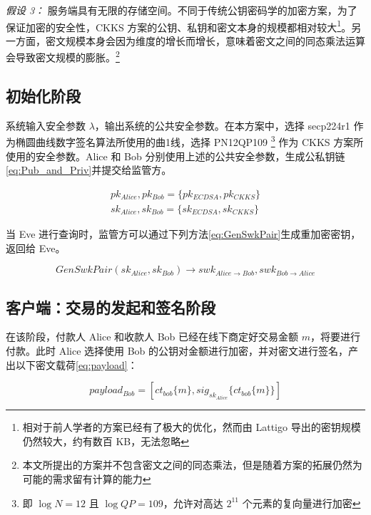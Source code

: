 \textit{假设 3：} 服务端具有无限的存储空间。不同于传统公钥密码学的加密方案，为了保证加密的安全性，CKKS 方案的公钥、私钥和密文本身的规模都相对较大\footnote{相对于前人学者的方案已经有了极大的优化，然而由 Lattigo 导出的密钥规模仍然较大，约有数百 KB，无法忽略}。另一方面，密文规模本身会因为维度的增长而增长，意味着密文之间的同态乘法运算会导致密文规模的膨胀。\footnote{本文所提出的方案并不包含密文之间的同态乘法，但是随着方案的拓展仍然为可能的需求留有计算的能力}

\subsection{初始化阶段}

系统输入安全参数 $\lambda$，输出系统的公共安全参数。在本方案中，选择 secp224r1 作为椭圆曲线数字签名算法所使用的曲1线，选择 PN12QP109 \footnote{即 $\log N = 12$ 且 $\log QP = 109$，允许对高达 $2^{11}$ 个元素的复向量进行加密} 作为 CKKS 方案所使用的安全参数。Alice 和 Bob 分别使用上述的公共安全参数，生成公私钥链\eqref{eq:Pub_and_Priv}并提交给监管方。

\begin{equation} \label{eq:Pub_and_Priv}
\begin{aligned}
    pk_{Alice}, pk_{Bob} = \{pk_{ECDSA}, pk_{CKKS}\}\\
    sk_{Alice}, sk_{Bob} = \{sk_{ECDSA}, sk_{CKKS}\}
\end{aligned}
\end{equation}

当 Eve 进行查询时，监管方可以通过下列方法\eqref{eq:GenSwkPair}生成重加密密钥，返回给 Eve。

\begin{equation} \label{eq:GenSwkPair}
    GenSwkPair(sk_{Alice}, sk_{Bob}) \rightarrow swk_{Alice \rightarrow Bob},
    swk_{Bob \rightarrow Alice}
\end{equation}

\subsection{客户端：交易的发起和签名阶段}

在该阶段，付款人 Alice 和收款人 Bob 已经在线下商定好交易金额 $m$，将要进行付款。此时 Alice 选择使用 Bob 的公钥对金额进行加密，并对密文进行签名，产出以下密文载荷\eqref{eq:payload}：

\begin{equation} \label{eq:payload}
payload_{Bob} = [ct_{bob}\{m\}, sig_{sk_{Alice}}\{ct_{bob}\{m\}\}]    
\end{equation}

